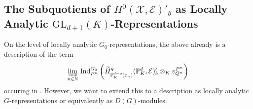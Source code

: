 \documentclass[a4paper, reqno, 10pt]{amsart}
\theoremstyle{definition}
\numberwithin{equation}{section}
\newcommand{\GL}{{\mathrm{GL}}}
\newcommand{\Ind}{{\mathrm{Ind}}}
\newcommand{\BN}{{\mathbb {N}}}
\newcommand{\BP}{{\mathbb {P}}}
\newcommand{\CE}{{\mathcal {E}}}
\newcommand{\CX}{{\mathcal {X}}}
\begin{document}
\subsection{The Subquotients of $H^0(\CX,\CE)'_b$ as Locally Analytic $\GL_{d+1}(K)$-Re\-pre\-sen\-ta\-tions}



On the level of locally analytic $G_0$-representations, the above  already is a description of the term
\begin{equation*}
	\varinjlim_{n\in\BN}\, \Ind^{G_0}_{P^n} \left( \widetilde{H}^{q}_{\BP_K^{d-q}(\varepsilon_n)} (\BP_K^d, \CE)'_b \otimes_K v^{P^n}_{Q^n} \right)
\end{equation*}
occuring in .
However, we want to extend this to a description as locally analytic $G$-re\-pre\-sen\-tations or equivalently as $D(G)$-modules.
\end{document}
